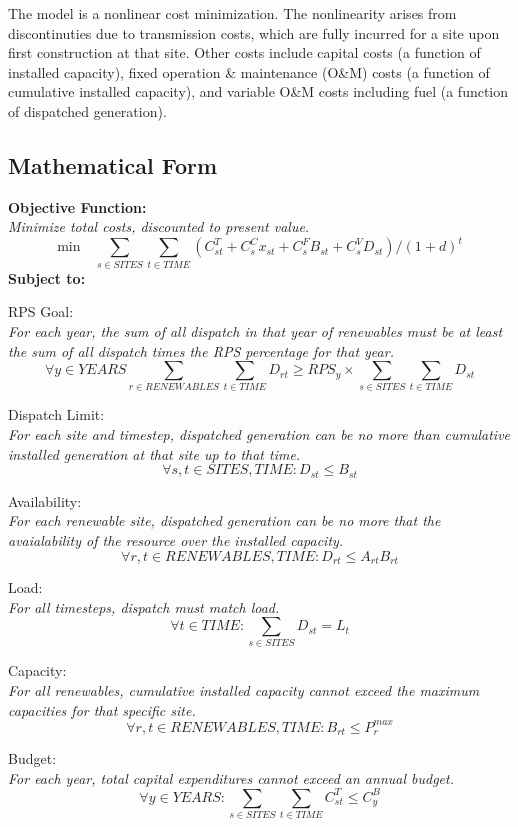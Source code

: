 \documentclass[12pt,letterpaper,fleqn]{article}
\begin{document}
The model is a nonlinear cost minimization. The nonlinearity arises
from discontinuties due to transmission costs, which are fully
incurred for a site upon first construction at that site. Other costs
include capital costs (a function of installed capacity), fixed
operation \& maintenance (O\&M) costs (a function of cumulative
installed capacity), and variable O\&M costs including fuel (a
function of dispatched generation).

\subsection{Mathematical Form}

\textbf{Objective Function:}\\
\emph{Minimize total costs, discounted to present value.}
  \[\text{min} \quad  \sum_{s \in SITES}\sum_{t \in TIME}(C_{st}^T + C_s^Cx_{st}
  + C_s^FB_{st} + C_s^VD_{st}) / (1 + d)^t\]
  \textbf{Subject to:}

  RPS Goal:\\
  \emph{For each year, the sum of all dispatch in that year of
    renewables must be at least the sum of all dispatch times the RPS
    percentage for that year.}
  \[\forall y \in YEARS \sum_{r \in RENEWABLES}\sum_{t \in TIME} D_{rt} \ge RPS_y \times
  \sum_{s \in SITES}\sum_{t \in TIME} D_{st}\]

  Dispatch Limit:\\
  \emph{For each site and timestep, dispatched generation can be no
    more than cumulative installed generation at that site up to that
    time.}
  \[\forall s,t \in SITES, TIME: D_{st} \le B_{st}\]

  Availability:\\
  \emph{For each renewable site, dispatched generation can be no more
    that the avaialability of the resource over the installed
    capacity.}
  \[\forall r,t \in RENEWABLES, TIME: D_{rt} \le A_{rt}B_{rt}\]

  Load:\\
  \emph{For all timesteps, dispatch must match load.}
  \[\forall t \in TIME: \sum_{s \in SITES} D_{st} = L_{t}\]

  Capacity:\\
  \emph{For all renewables, cumulative installed capacity cannot
    exceed the maximum capacities for that specific site.}
  \[\forall r,t \in RENEWABLES, TIME: B_{rt} \le P_r^{max}\]

  Budget:\\
  \emph{For each year, total capital expenditures cannot exceed an
    annual budget.}
  \[\forall y \in YEARS: \sum_{s \in SITES}\sum_{t \in TIME} C_{st}^T
  \le C_{y}^B\]
\end{document}
